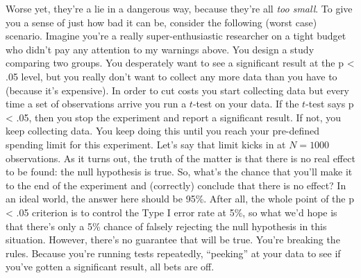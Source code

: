 \documentclass[
  a4paper,
]{book}
\begin{document}
Worse yet, they're a lie in a dangerous way, because they're all
\emph{too small}. To give you a sense of just how bad it can be,
consider the following (worst case) scenario. Imagine you're a really
super-enthusiastic researcher on a tight budget who didn't pay any
attention to my warnings above. You design a study comparing two groups.
You desperately want to see a significant result at the p \textless{}
.05 level, but you really don't want to collect any more data than you
have to (because it's expensive). In order to cut costs you start
collecting data but every time a set of observations arrive you run a
\(t\)-test on your data. If the \(t\)-test says p \textless{} .05, then
you stop the experiment and report a significant result. If not, you
keep collecting data. You keep doing this until you reach your
pre-defined spending limit for this experiment. Let's say that limit
kicks in at \(N = 1000\) observations. As it turns out, the truth of the
matter is that there is no real effect to be found: the null hypothesis
is true. So, what's the chance that you'll make it to the end of the
experiment and (correctly) conclude that there is no effect? In an ideal
world, the answer here should be 95\%. After all, the whole point of the
p \textless{} .05 criterion is to control the Type I error rate at 5\%,
so what we'd hope is that there's only a 5\% chance of falsely rejecting
the null hypothesis in this situation. However, there's no guarantee
that will be true. You're breaking the rules. Because you're running
tests repeatedly, ``peeking'' at your data to see if you've gotten a
significant result, all bets are off.
\end{document}
